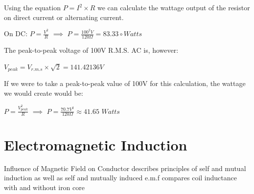 \documentclass[11pt,a4paper]{article}
\begin{document}
Using the equation $P = I^2 \times R$ we can calculate the wattage output of the resistor on direct current or alternating current.

On DC: $P=\frac{V^2}{R}$ $\implies$ $P = \frac{100^2V}{120\Omega}=83.33\circ Watts$

The peak-to-peak voltage of 100V R.M.S. AC is, however:

$V_{peak} = V_{r.m.s} \times \sqrt{2} = 141.42136 V$

If we were to take a peak-to-peak value of 100V for this calculation, the wattage we would create would be:

$P=\frac{V_{peak}^2}{R}$ $\implies$ $P = \frac{70.7V^2}{120\Omega}\approx 41.65$ $Watts$
\section{Electromagnetic Induction}
Influence of Magnetic Field on Conductor
describes principles of self and mutual induction as well as self and mutually induced e.m.f
compares coil inductance with and without iron core
\end{document}
